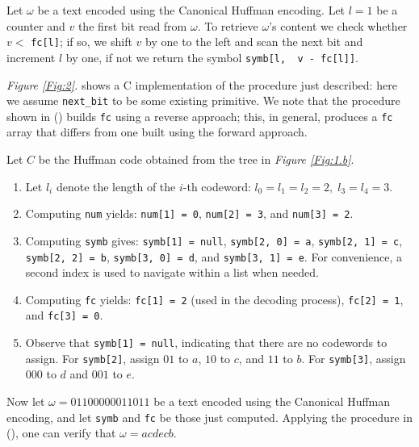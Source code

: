 \documentclass{subfiles}
\begin{document}
    Let \(\omega\) be a text encoded using the Canonical Huffman encoding.
        Let \(l = 1\) be a counter and \(v\) the first bit read from \(\omega\).
        To retrieve \(\omega\)'s content we check whether \(v <\) \lstinline{fc[l]};
        if so, we shift \(v\) by one to the left and scan the next bit and increment \(l\) by one,
        if not we return the symbol \lstinline{symb[l,  v - fc[l]]}.

    \emph{Figure \ref{Fig:2}.} shows a C implementation of the procedure just described:
        here we assume \lstinline{next_bit} to be some existing primitive.
    We note that the procedure shown in () builds \lstinline{fc}
        using a reverse approach; this, in general, produces a \lstinline{fc} array that 
        differs from one built using the forward approach.
        \clearpage
        
    \begin{example*}
        Let \(C\) be the Huffman code obtained from the tree in \emph{Figure \ref{Fig:1.b}}.
        \begin{enumerate}
            \item Let \(l_{i}\) denote the length of the \(i\)-th codeword:
                \(l_{0} = l_{1} = l_{2} = 2, \; l_{3} = l_{4} = 3\).

            \item Computing \lstinline{num} yields:
                \lstinline{num[1] = 0}, 
                \lstinline{num[2] = 3}, and 
                \lstinline{num[3] = 2}.

            \item Computing \lstinline{symb} gives:
                \lstinline{symb[1] = null}, 
                \lstinline{symb[2, 0] = a}, 
                \lstinline{symb[2, 1] = c}, 
                \lstinline{symb[2, 2] = b}, 
                \lstinline{symb[3, 0] = d}, and 
                \lstinline{symb[3, 1] = e}.
                For convenience, a second index is used to navigate within a list when needed.

            \item Computing \lstinline{fc} yields:
                \lstinline{fc[1] = 2} 
                (used in the decoding process),
                \lstinline{fc[2] = 1}, and
                \lstinline{fc[3] = 0}.

            \item Observe that \lstinline{symb[1] = null}, 
                indicating that there are no codewords to assign.
                For \lstinline{symb[2]}, assign \(01\) to \(a\), \(10\) to \(c\), and \(11\) to \(b\). 
                For \lstinline{symb[3]}, assign \(000\) to \(d\) and \(001\) to \(e\).
        \end{enumerate}
            
            Now let \(\omega = 01 10 000 001 10 11\) be a text encoded using the Canonical Huffman encoding,
                and let \lstinline{symb} and \lstinline{fc} be those just computed.
            Applying the procedure in (), one can verify that \(\omega = acdecb\).
    \end{example*}
\end{document}

